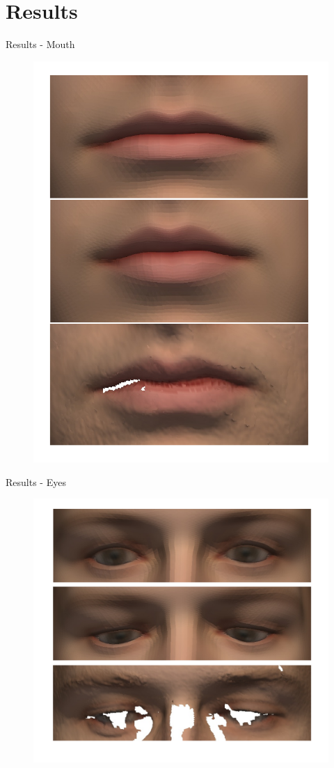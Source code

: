 \documentclass[xcolor=x11names,compress]{beamer}
\begin{document}
\section{Results}
\begin{frame}{Results - Mouth}
    \begin{figure}
        \centering
        \includegraphics[width=.5\textwidth]{../resources/img/00029_mouth_comparison.pdf}
    \end{figure}
\end{frame}
\begin{frame}{Results - Eyes}
    \begin{figure}
        \centering
        \includegraphics[width=.8\textwidth]{../resources/img/00029_eyes_comparison.pdf}
    \end{figure}
\end{frame}
\end{document}
